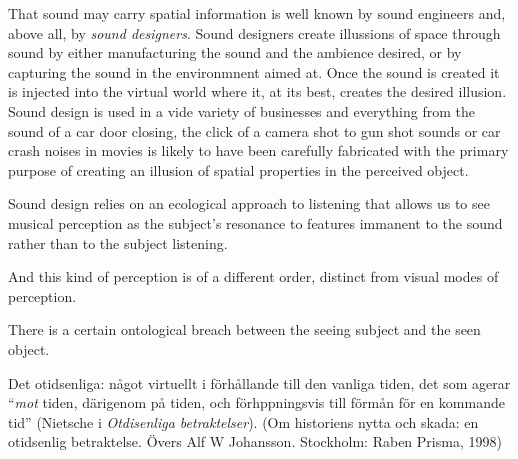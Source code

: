 




That sound may carry spatial information is well known by sound engineers and, above all, by \emph{sound designers}. Sound designers create illussions of space through sound by either manufacturing the sound and the ambience desired, or by capturing the sound in the environmnent aimed at.
Once the sound is created it is injected into the virtual world where it, at its best, creates the desired illusion. Sound design is used in a vide variety of businesses and everything from the sound of a car door closing, the click of a camera shot to gun shot sounds or car crash noises in movies is likely to have been carefully fabricated with the primary purpose of creating an illusion of spatial properties in the perceived object. 

Sound design relies on an ecological approach to listening that allows us to see musical perception as the subject's resonance to features immanent to the sound rather than to the subject listening. 

And this kind of perception is of a different order, distinct from visual modes of perception. 

There is a certain ontological breach between the seeing subject and the seen object. 




Det otidsenliga: något virtuellt i förhållande till den vanliga tiden, det som agerar ``\emph{mot} tiden, därigenom på tiden, och förhppningsvis till förmån för en kommande tid'' (Nietsche i \emph{Otdisenliga betraktelser}). (Om historiens nytta och skada: en otidsenlig betraktelse. Övers Alf W Johansson. Stockholm: Raben Prisma, 1998)


